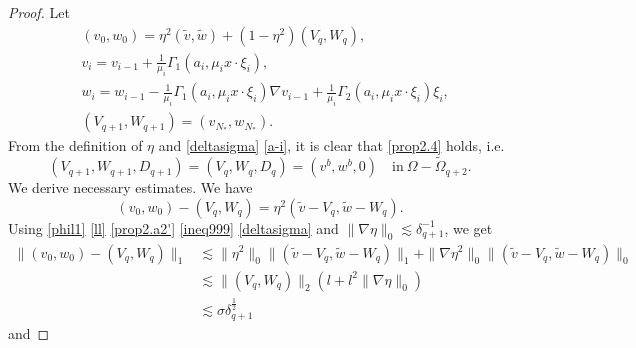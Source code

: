 \documentclass[reqno,12pt]{amsart}
\numberwithin{equation}{section}
\theoremstyle{plain}
\theoremstyle{definition}
\begin{document}
\begin{proof}
Let
\begin{align}
    &(v_0, w_0)=\eta^2(\tilde v,\tilde w)+(1-\eta^2)(V_q,W_q),\\
    & v_i= v_{i-1}+\frac{1}{\mu_i}\Gamma_1(a_i, \mu_i x\cdot \xi_i),\\
    & w_i= w_{i-1}-\frac{1}{\mu_i}\Gamma_1(a_i,\mu_i x\cdot \xi_i)\nabla v_{i-1}+\frac{1}{\mu_i}\Gamma_2(a_i,\mu_i x\cdot \xi_i) \xi_i,\\
    & (V_{q+1},W_{q+1})=(v_{N_*},w_{N_*}).
\end{align}
From the definition of $\eta$ and \eqref{deltasigma}  \eqref{a-i}, it is clear that \eqref{prop2.4} holds, i.e.
\begin{equation*}
    (V_{q+1},W_{q+1},D_{q+1})=(V_q,W_q,D_q)=(v^b,w^b,0)\quad\text{in}\ \Omega-\tilde\Omega_{q+2}.
\end{equation*}
We derive necessary estimates. We have
\begin{equation*}
    (v_0,w_0)-(V_q,W_q)=\eta^2(\tilde v-V_q,\tilde w-W_q).
\end{equation*}
Using \eqref{phil1} \eqref{ll} \eqref{prop2.a2'} \eqref{ineq999} \eqref{deltasigma} and $\|\nabla\eta\|_0\lesssim \delta_{q+1}^{-1}$, we get
\begin{align*}
    \|(v_0,w_0)-(V_q,W_q)\|_1
    &\lesssim \|\eta^2\|_0\|(\tilde v-V_q,\tilde w-W_q)\|_1+\|\nabla\eta^2\|_0\|(\tilde v-V_q,\tilde w-W_q)\|_0\\
    &\lesssim\|(V_q,W_q)\|_2 (l+l^2\|\nabla\eta\|_0)\\
    &\lesssim \sigma\delta_{q+1}^\frac{1}{2}
\end{align*}
and

\end{proof}
\end{document}

